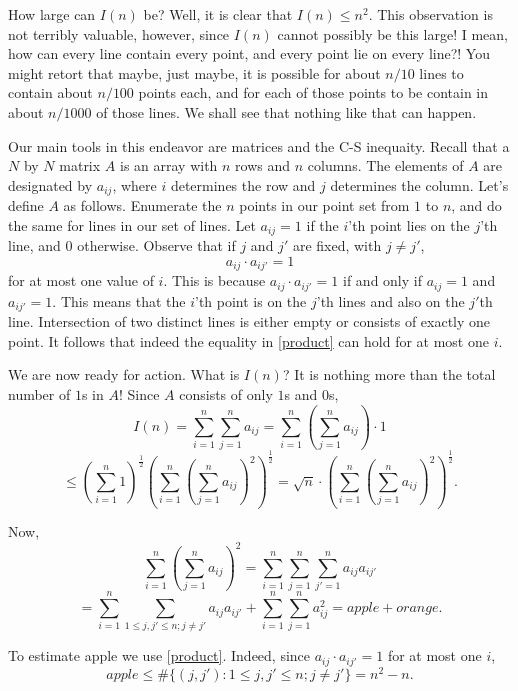 \documentclass[]{amsart}
\numberwithin{equation}{section}
\theoremstyle{plain}
\theoremstyle{definition}
\theoremstyle{remark}
\begin{document}
How large can $I(n)$ be? Well, it is clear that $I(n) \leq n^2$. This
observation is not terribly valuable, however, since $I(n)$ cannot
possibly be this large! I mean, how can every line contain every point,
and every point lie on every line?! You might retort that maybe, just
maybe, it is possible for about $n/10$ lines to contain about $n/100$
points each, and for each of those points to be contain in about $n/1000$
of those lines. We shall see that nothing like that can happen.

Our main tools in this endeavor are matrices and the C-S inequaity. Recall
that a $N$ by $N$ matrix $A$ is an array with $n$ rows and $n$ columns.
The elements of $A$ are designated by $a_{ij}$, where $i$ determines the
row and $j$ determines the column. Let's define $A$ as follows.
Enumerate the $n$ points in our point set from $1$ to $n$, and do the
same for lines in our set of lines. Let $a_{ij}=1$ if the $i$'th point
lies on the $j$'th line, and $0$ otherwise. Observe that if $j$ and $j'$
are fixed, with $j \not=j'$,
\begin{equation} \label{product} a_{ij} \cdot a_{ij'}=1 \end{equation} for at most one value of $i$. This
is because $a_{ij} \cdot a_{ij'}=1$ if and only if $a_{ij}=1$ and
$a_{ij'}=1$. This means that the $i$'th point is on the $j$'th lines and
also on the $j'$th line. Intersection of two distinct lines is either
empty or consists of exactly one point. It follows that indeed the
equality in \ref{product} can hold for at most one $i$.

We are now ready for action. What is $I(n)$? It is nothing more than the
total number of $1$s in $A$! Since $A$ consists of only $1$s and $0$s,
$$ I(n)=\sum_{i=1}^n \sum_{j=1}^n a_{ij}=\sum_{i=1}^n \left(\sum_{j=1}^n
a_{ij}\right) \cdot 1$$
$$ \leq {\left(\sum_{i=1}^n 1 \right)}^{\frac{1}{2}} {\left( \sum_{i=1}^n
{\left( \sum_{j=1}^n a_{ij} \right)}^2 \right)}^{\frac{1}{2}}=\sqrt{n}
\cdot {\left( \sum_{i=1}^n
{\left( \sum_{j=1}^n a_{ij} \right)}^2 \right)}^{\frac{1}{2}}. $$

Now,
$$ \sum_{i=1}^n
{\left( \sum_{j=1}^n a_{ij} \right)}^2=\sum_{i=1}^n \sum_{j=1}^n
\sum_{j'=1}^n a_{ij}a_{ij'}$$
$$=\sum_{i=1}^n \sum_{1 \leq j,j' \leq n; j \not=j'}
a_{ij}a_{ij'}+\sum_{i=1}^n \sum_{j=1}^n a_{ij}^2=apple+orange. $$

To estimate apple we use \ref{product}. Indeed, since $a_{ij} \cdot a_{ij'}=1$
for at most one $i$,
\begin{equation} \label{apple} apple \leq \# \{(j,j'): 1 \leq j,j' \leq n; j \not=j'\}=n^2-n.\end{equation}
\end{document}
